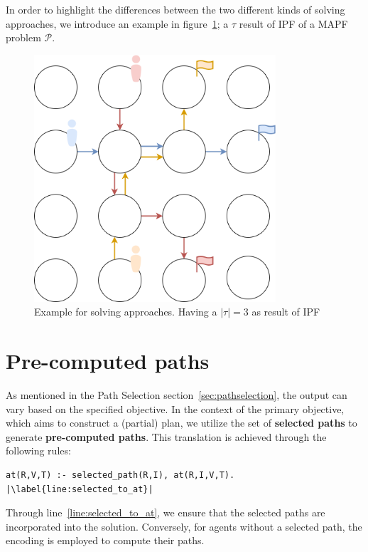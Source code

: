In order to highlight the differences between the two different kinds of solving approaches, we introduce an example in figure~\ref{fig:partial_solving_example}; a \(\tau\) result of IPF of a MAPF problem \(\mathcal{P}\).

\begin{figure}[H]
    \centering
    \caption{Example for solving approaches. Having a \(|\tau| = 3\) as result of IPF}\label{fig:partial_solving_example}
    \includegraphics[width=9cm]{img/partial_solving_example.png}
\end{figure}




\section{Pre-computed paths}
As mentioned in the Path Selection section~\ref{sec:pathselection}, the output can vary based on the specified objective. In the context of the primary objective, which aims to construct a (partial) plan, we utilize the set of \textbf{selected paths} to generate \textbf{pre-computed paths}. This translation is achieved through the following rules:

\begin{minipage}[H]{\linewidth}
\begin{lstlisting}[style=mystyle]
    at(R,V,T) :- selected_path(R,I), at(R,I,V,T). |\label{line:selected_to_at}|
\end{lstlisting}
\end{minipage} 
\noindent Through line~\ref{line:selected_to_at}, we ensure that the selected paths are incorporated into the solution. Conversely, for agents without a selected path, the encoding is employed to compute their paths.

